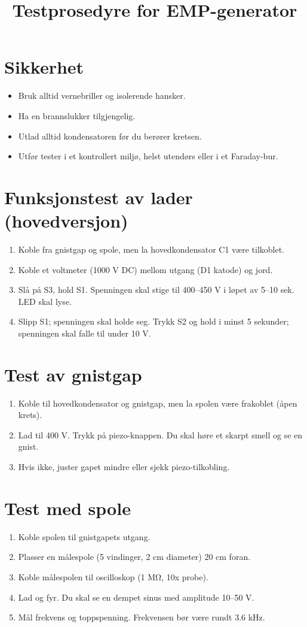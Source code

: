 \documentclass{article}
\title{Testprosedyre for EMP-generator}
\author{}
\date{}
\begin{document}
\maketitle

\section{Sikkerhet}
\begin{itemize}
\item Bruk alltid vernebriller og isolerende hansker.
\item Ha en brannslukker tilgjengelig.
\item Utlad alltid kondensatoren før du berører kretsen.
\item Utfør tester i et kontrollert miljø, helst utendørs eller i et Faraday-bur.
\end{itemize}

\section{Funksjonstest av lader (hovedversjon)}
\begin{enumerate}
\item Koble fra gnistgap og spole, men la hovedkondensator C1 være tilkoblet.
\item Koble et voltmeter (1000 V DC) mellom utgang (D1 katode) og jord.
\item Slå på S3, hold S1. Spenningen skal stige til 400–450 V i løpet av 5–10 sek. LED skal lyse.
\item Slipp S1; spenningen skal holde seg. Trykk S2 og hold i minst 5 sekunder; spenningen skal falle til under 10 V.
\end{enumerate}

\section{Test av gnistgap}
\begin{enumerate}
\item Koble til hovedkondensator og gnistgap, men la spolen være frakoblet (åpen krets).
\item Lad til 400 V. Trykk på piezo-knappen. Du skal høre et skarpt smell og se en gnist.
\item Hvis ikke, juster gapet mindre eller sjekk piezo-tilkobling.
\end{enumerate}

\section{Test med spole}
\begin{enumerate}
\item Koble spolen til gnistgapets utgang.
\item Plasser en målespole (5 vindinger, 2 cm diameter) 20 cm foran.
\item Koble målespolen til oscilloskop (1 MΩ, 10x probe).
\item Lad og fyr. Du skal se en dempet sinus med amplitude 10–50 V.
\item Mål frekvens og toppspenning. Frekvensen bør være rundt 3.6 kHz.
\end{enumerate}
\end{document}
